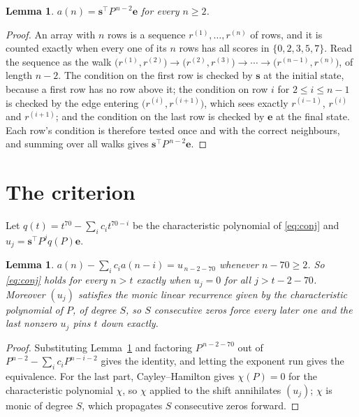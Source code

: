 \documentclass[11pt,a4paper]{article}
\theoremstyle{plain}
\newtheorem{lemma}[theorem]{Lemma}
\theoremstyle{definition}
\begin{document}
\begin{lemma}\label{lem:walk}
$a(n)=\mathbf{s}^{\!\top}P^{\,n-2}\mathbf{e}$ for every $n\ge2$.
\end{lemma}

\begin{proof}
An array with $n$ rows is a sequence $r^{(1)},\dots,r^{(n)}$ of rows, and it is counted
exactly when every one of its $n$ rows has all scores in $\{0,2,3,5,7\}$. Read the sequence as the
walk $\bigl(r^{(1)},r^{(2)}\bigr)\to\bigl(r^{(2)},r^{(3)}\bigr)\to\cdots\to
\bigl(r^{(n-1)},r^{(n)}\bigr)$, of length $n-2$. The condition on the first row is
checked by $\mathbf{s}$ at the initial state, because a first row has no row above it; the
condition on row $i$ for $2\le i\le n-1$ is checked by the edge entering
$\bigl(r^{(i)},r^{(i+1)}\bigr)$, which sees exactly $r^{(i-1)}$, $r^{(i)}$ and
$r^{(i+1)}$; and the condition on the last row is checked by $\mathbf{e}$ at the final
state. Each row's condition is therefore tested once and with the correct neighbours, and
summing over all walks gives $\mathbf{s}^{\!\top}P^{\,n-2}\mathbf{e}$.
\end{proof}

\section{The criterion}

Let $q(t)=t^{70}-\sum_i c_i t^{70-i}$ be the characteristic polynomial of
\eqref{eq:conj} and $u_j=\mathbf{s}^{\!\top}P^{j}q(P)\mathbf{e}$.

\begin{lemma}\label{lem:crit}
$a(n)-\sum_i c_i a(n-i)=u_{\,n-2-70}$ whenever $n-70\ge2$. So \eqref{eq:conj}
holds for every $n>t$ exactly when $u_j=0$ for all $j>t-2-70$. Moreover $(u_j)$
satisfies the monic linear recurrence given by the characteristic polynomial of $P$, of
degree $S$, so $S$ consecutive zeros force every later one and the last nonzero $u_j$ pins
$t$ down exactly.
\end{lemma}

\begin{proof}
Substituting Lemma~\ref{lem:walk} and factoring $P^{\,n-2-70}$ out of
$P^{n-2}-\sum_i c_i P^{n-i-2}$ gives the identity, and letting the exponent run gives the
equivalence. For the last part, Cayley--Hamilton gives $\chi(P)=0$ for the characteristic
polynomial $\chi$, so $\chi$ applied to the shift annihilates $(u_j)$; $\chi$ is monic of
degree $S$, which propagates $S$ consecutive zeros forward.
\end{proof}
\end{document}
